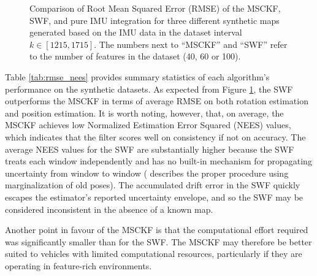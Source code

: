 \documentclass[letterpaper, 10 pt, conference]{ieeeconf}  %
\begin{document}
\begin{figure}
    \centering


    \caption{Comparison of Root Mean Squared Error (RMSE) of the MSCKF, SWF, and pure IMU integration for three different synthetic maps generated based on the IMU data in the dataset interval $k\in[1215,1715]$. The numbers next to ``MSCKF'' and ``SWF'' refer to the number of features in the dataset (40, 60 or 100).}
    \label{fig:comp_3}
\end{figure}

Table \ref{tab:rmse_nees} provides summary statistics of each algorithm's performance on the synthetic datasets.
As expected from Figure \ref{fig:comp_3}, the SWF outperforms the MSCKF in terms of average RMSE on both rotation estimation and position estimation.
It is worth noting, however, that, on average, the MSCKF achieves low Normalized Estimation Error Squared (NEES) values, which indicates that the filter scores well on consistency if not on accuracy.
The average NEES values for the SWF are substantially higher because the SWF treats each window independently and has no built-in mechanism for propagating uncertainty from window to window (\cite{Sibley:2010:JFR} describes the proper procedure using marginalization of old poses).
The accumulated drift error in the SWF quickly escapes the estimator's reported uncertainty envelope, and so the SWF may be considered inconsistent in the absence of a known map.

Another point in favour of the MSCKF is that the computational effort required was significantly smaller than for the SWF.
The MSCKF may therefore be better suited to vehicles with limited computational resources, particularly if they are operating in feature-rich environments.
\end{document}
